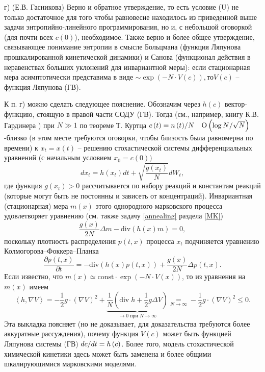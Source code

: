 \begin{remark}
г) (Е.В. Гасникова) Верно и обратное утверждение, то есть условие (U) не только достаточное для того чтобы равновесие находилось из приведенной выше задачи энтропийно-линейного программирования, но и, с небольшой оговоркой (для почти всех $c\left( 0 \right)$), необходимое. Также верно и более общее утверждение, связывающее понимание энтропии в смысле Больцмана (функция Ляпунова прошкалированной кинетической динамики) и Санова (функционал действия в неравенствах больших уклонений для инвариантной меры): если стационарная мера асимптотически представима в виде $\sim \exp \left( {-N\cdot 
V\left( c \right)} \right), то V\left( c \right)$  -- функция Ляпунова (ГВ).

К п. г) можно сделать следующее пояснение. Обозначим через $h\left( c 
\right)$ вектор-функцию, стоящую в правой части СОДУ (ГВ). Тогда (см., 
например, книгу К.В. Гардинера \cite{333}) при $N\gg 1$ по теореме Т. Куртца ${c\left( 
t \right)=n\left( t \right)} \mathord{\left/ {\vphantom {{c\left( t 
\right)=n\left( t \right)} N}} \right. \kern-\nulldelimiterspace} N \quad {\rm 
O}\left( {\log N} /{\sqrt N } \right)$-близко (в этом месте 
требуются оговорки, чтобы близость была равномерна по времени) к $x_t 
=x\left( t \right)$ -- решению стохастической системы дифференциальных 
уравнений (с начальным условием $x_0 =c\left( 0 \right))$
\[
dx_t =h\left( {x_t } \right)dt+\sqrt {\frac{g\left( {x_t } \right)}{N}} dW_t 
,
\]
где функция $g\left( {x_t } \right)>0$ рассчитывается по набору реакций и 
константам реакций (которые могут быть не постоянны и зависеть от 
концентраций). Инвариантная (стационарная) мера $m\left( x \right)$ этого 
однородного марковского процесса удовлетворяет уравнению (см. также задачу \ref{annealing} раздела \ref{MK})
\[
\frac{g\left( x \right)}{2N}\Delta m-\mbox{div}\left( {h\left( x \right)m} 
\right)=0,
\]
поскольку плотность распределения $p\left( {t,x} \right)$ процесса $x_t $ 
подчиняется уравнению Колмогорова--Фоккера--Планка
\[
\frac{\partial p\left( {t,x} \right)}{\partial t}=-\mbox{div}\left( {h\left( 
x \right)p\left( {t,x} \right)} \right)+\frac{g\left( x \right)}{2N}\Delta 
p\left( {t,x} \right).
\]
Если известно, что $m\left( x \right)\simeq \mbox{const}\cdot \exp \left( 
{-N\cdot V\left( x \right)} \right)$, то из уравнения на $m\left( x \right)$ 
имеем
\[
\left\langle {h,\nabla V} \right\rangle =-\frac{1}{2}g\cdot \left( {\nabla 
V} \right)^2+\underbrace {\frac{1}{N}\left( 
{\mbox{div}\;h+\frac{1}{2}g\Delta V} \right)}_{\to 0\mbox{ при }N\to \infty 
}\mathop =\limits_{N\to \infty } -\frac{1}{2}g\cdot \left( {\nabla V} 
\right)^2\le 0.
\]
Эта выкладка поясняет (но не доказывает, для доказательства требуются более 
аккуратные рассуждения), почему функция $V\left( c \right)$ может быть 
функцией Ляпунова системы (ГВ) ${dc} \mathord{\left/ {\vphantom {{dc} {dt}}} 
\right. \kern-\nulldelimiterspace} {dt}=h\left( c \right)$. Более того, 
модель стохастической химической кинетики здесь может быть заменена и более 
общими шкалирующимися марковскими моделями.

\end{remark}

